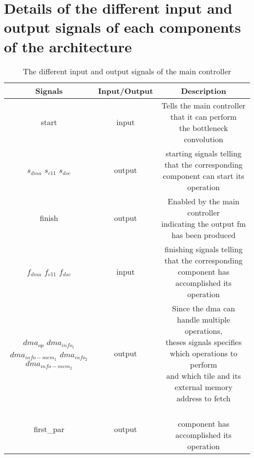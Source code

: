 \chapter{Details of the different input and output signals of each components of the architecture} \label{appendix:sig}
\begin{table}[H]
    \begin{tabular}{c|c|c}
        Signals & Input/Output & Description \\
        \hline \hline
        start & input & \makecell{Tells the main controller that it can perform \\ the bottleneck convolution}\\
        \hline
        \makecell{$s_{dma}$ \\$s_{c11}$\\$s_{dsc}$} & output & \makecell{starting signals telling that the corresponding \\ component can start its operation}\\
        \hline
        finish & output & \makecell{Enabled by the main controller \\ indicating the output \acrshort{fm} has been produced}\\
        \hline
        \makecell{$f_{dma}$ \\$f_{c11}$\\$f_{dsc}$} & input & \makecell{finishing signals telling that the corresponding \\ component has accomplished its operation}\\
        \hline
        \makecell{$dma_{op}$\\$dma_{info_1}$\\$dma_{info-mem_1}$\\$dma_{info_2}$\\$dma_{info-mem_2}$} & output & \makecell{Since the \acrshort{dma} can handle multiple operations,\\ theses signals specifies which operations to perform \\ and which tile and its external memory address to fetch}\\
        \hline
        first\_par & output & \makecell{ \\ component has accomplished its operation} \\
        \hline \hline
    \end{tabular}
    \caption{The different input and output signals of the main controller}
    \label{tab:mc_sig}
\end{table}
\newpage
